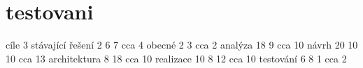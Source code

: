 \section{testovani}
cíle                    3   
stávající řešení        2   6   7   cca 4
obecné                      2   3   cca 2
analýza                 18      9   cca 10
návrh                   20  10  10  cca 13
architektura            8   18      cca 10
realizace               10  8   12  cca 10
testování               6   8   1   cca 2